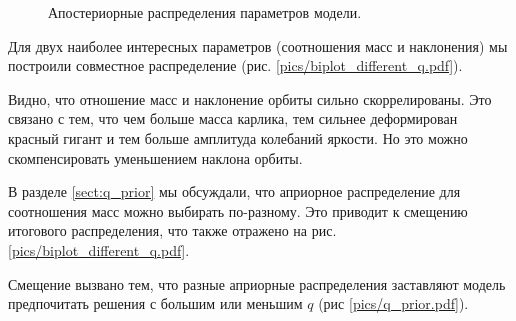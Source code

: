 \begin{figure}
{}
\label{fig:dists}
\caption{Апостериорные распределения параметров модели.}
\end{figure}



Для двух наиболее интересных параметров (соотношения масс и наклонения) мы построили совместное распределение (рис. \ref{pics/biplot_different_q.pdf}).

Видно, что отношение масс и наклонение орбиты сильно скоррелированы. Это связано с тем, что чем больше масса карлика, тем сильнее деформирован красный гигант и тем больше амплитуда колебаний яркости. Но это можно скомпенсировать уменьшением наклона орбиты.

В разделе \ref{sect:q_prior} мы обсуждали, что априорное распределение для соотношения масс можно выбирать по-разному. Это приводит к смещению итогового распределения, что также отражено на рис. \ref{pics/biplot_different_q.pdf}.


Смещение вызвано тем, что разные априорные распределения заставляют модель предпочитать решения с большим или меньшим $q$ (рис \ref{pics/q_prior.pdf}).

